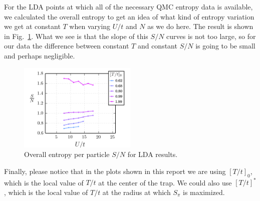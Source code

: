 \documentclass[11pt,letter]{article}
\begin{document}
For the LDA points at which all of the necessary QMC entropy data is available,
we calculated the overall entropy to get an idea of what kind of entropy
variation we get at constant $T$ when varying $U/t$ and $N$ as we do here.  The
result is shown in Fig.~\ref{fig:udataS}.   What we see is that the slope of
this $S/N$ curves is not too large,  so for our data the difference between
constant $T$ and constant $S/N$ is going to be small and perhaps negligible.  

\begin{figure}[H]
    \centering \includegraphics[width=0.5\textwidth]{figures/udataS.png}
\caption{ Overall entropy per particle $S/N$ for LDA results.} 
\label{fig:udataS}
\end{figure}


Finally, please notice that in the plots shown in this report we are using
$[T/t]_{0}$, which is the local value of $T/t$ at the center of the trap.   We
could also use $[T/t]^{*}$, which is the local value of $T/t$ at the radius at
which $S_{\pi}$ is maximized.  
 
 
\end{document}
